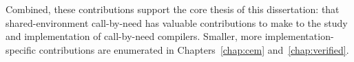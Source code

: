 Combined, these contributions support the core thesis of this dissertation: that
shared-environment call-by-need has valuable contributions to make to the study
and implementation of call-by-need compilers. Smaller, more
implementation-specific contributions are enumerated in Chapters~\ref{chap:cem}
and~\ref{chap:verified}. 
